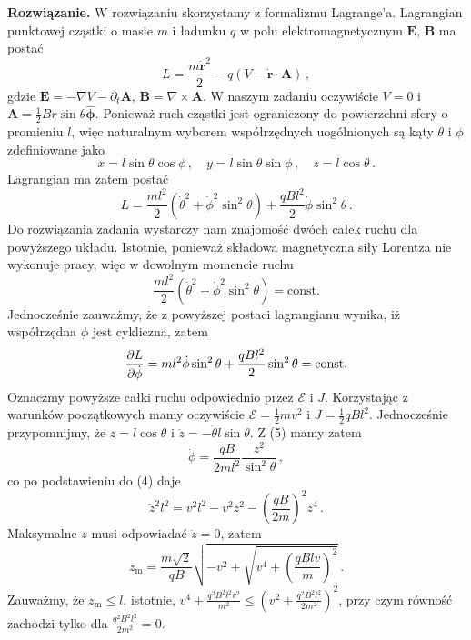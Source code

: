 \documentclass[../main.tex]{subfiles}
\begin{document}
\noindent\textbf{Rozwiązanie.} W rozwiązaniu skorzystamy z formalizmu Lagrange'a. Lagrangian punktowej cząstki o masie \(m\) i ładunku \(q\) w polu elektromagnetycznym \(\mathbf{E}\), \(\mathbf{B}\) ma postać
\begin{equation*}
    L=\frac{m\Dot{\mathbf{r}}^2}{2}-q(V-\dot{\mathbf{r}}\cdot\mathbf{A})\,,
\end{equation*}
gdzie \(\mathbf{E}=-\nabla V-\partial_t\mathbf{A}\), \(\mathbf{B}=\nabla\times\mathbf{A}\). W naszym zadaniu oczywiście \(V=0\) i \(\mathbf{A}=\frac{1}{2}Br\sin\theta\boldsymbol{\hat{\phi}}\). Ponieważ ruch cząstki jest ograniczony do powierzchni sfery o promieniu \(l\), więc naturalnym wyborem współrzędnych uogólnionych są kąty \(\theta\) i \(\phi\) zdefiniowane jako
\begin{equation*}
        x=l\sin\theta\cos\phi\,,\quad y=l\sin\theta\sin\phi\,,\quad z=l\cos\theta\,.
\end{equation*}
Lagrangian ma zatem postać
\begin{equation*}
    L=\frac{ml^2}{2}(\dot{\theta}^2+\dot{\phi}^2\sin^2\theta)+\frac{qBl^2}{2}\dot{\phi}\sin^2\theta\,.
\end{equation*}
Do rozwiązania zadania wystarczy nam znajomość dwóch całek ruchu dla powyższego układu. Istotnie, ponieważ składowa magnetyczna siły Lorentza nie wykonuje pracy, więc w dowolnym momencie ruchu
\begin{equation*}
    \frac{ml^2}{2}(\dot{\theta}^2+\dot{\phi}^2\sin^2\theta)=\text{const.}
\end{equation*}
Jednocześnie zauważmy, że z powyższej postaci lagrangianu wynika, iż współrzędna \(\phi\) jest cykliczna, zatem
\begin{equation*}
    \pdv{L}{\dot{\phi}}=ml^2\dot{\phi}\sin^2\theta+\frac{qBl^2}{2}\sin^2\theta=\text{const.}
\end{equation*}
Oznaczmy powyższe całki ruchu odpowiednio przez \(\mathscr{E}\) i \(J\). Korzystając z warunków początkowych mamy oczywiście \(\mathscr{E}=\frac{1}{2}mv^2\) i \(J=\frac{1}{2}qBl^2\). Jednocześnie przypomnijmy, że \(z=l\cos\theta\) i \(\dot{z}=-\dot{\theta}l\sin\theta\). Z (5) mamy zatem
\begin{equation*}
    \dot{\phi}=\frac{qB}{2ml^2}\frac{z^2}{\sin^2\theta}\,,
\end{equation*}
co po podstawieniu do (4) daje
\begin{equation*}
    \dot{z}^2l^2=v^2l^2-v^2z^2-\left(\frac{qB}{2m}\right)^2z^4\,.
\end{equation*}
Maksymalne \(z\) musi odpowiadać \(\dot{z}=0\), zatem
\begin{equation*}
    z_\text{m}=\frac{m\sqrt{2}}{qB}\sqrt{-v^2+\sqrt{v^4+\left(\frac{qBlv}{m}\right)^2}}\,.
\end{equation*}
Zauważmy, że \(z_\text{m}\leq l\), istotnie, \(v^4+\frac{q^2B^2l^2v^2}{m^2}\leq(v^2+\frac{q^2B^2l^2}{2m^2})^2\), przy czym równość zachodzi tylko dla \(\frac{q^2B^2l^2}{2m^2}=0\).
\newpage
\end{document}
